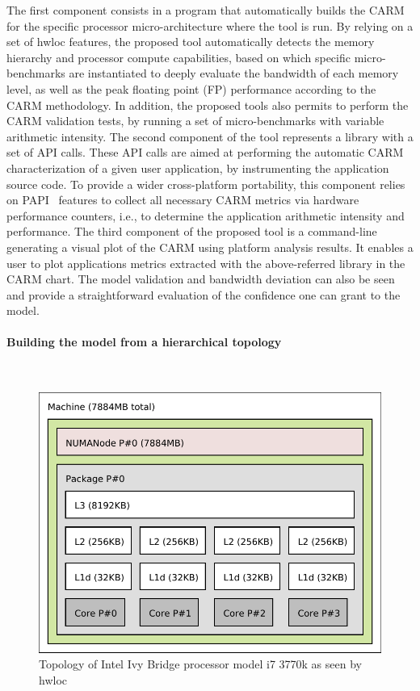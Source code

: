 \documentclass[twoside,twocolumn,8pt]{extarticle}
\begin{document}
The first component consists in a program that automatically  builds the CARM for the specific processor micro-architecture where
the tool is run. By relying on a set of hwloc features, the proposed tool automatically detects the memory hierarchy and processor
compute capabilities, based on which specific micro-benchmarks are instantiated to deeply evaluate the bandwidth of each memory
level,  as well as the peak floating point (FP) performance according to the CARM methodology.
In addition, the proposed tools also permits to perform the CARM validation tests, by running a set of micro-benchmarks with
variable arithmetic intensity. 
The second component of the tool represents  a library with a set of API calls. These API calls are aimed at performing the
automatic CARM characterization of a given user application, by instrumenting the application source code.
To provide a wider cross-platform portability, this component relies on PAPI~\cite{mucci1999papi} features to collect all
necessary CARM metrics via hardware performance counters, i.e., to determine the application arithmetic intensity and performance.
The third component of the proposed tool is a command-line generating a visual plot of the CARM using platform analysis results. It
enables a user to plot applications metrics extracted with the above-referred library in the CARM chart.
The model validation and bandwidth deviation can also be seen and provide a straightforward evaluation of the confidence one can
grant to the model.

\paragraph*{Building the model from a hierarchical topology}\mbox{}\\

\begin{figure}
  \includegraphics[width=.5\textwidth]{pictures/i7_3770k.pdf}
  \caption{Topology of Intel Ivy Bridge processor model i7 3770k as seen by hwloc}
  \label{fig:topology_adriana}
\end{figure}
\end{document}
